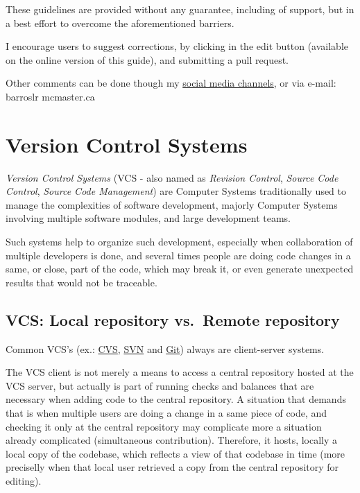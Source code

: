 \documentclass[
]{book}
\begin{document}
These guidelines are provided without any guarantee, including of support, but
in a best effort to overcome the aforementioned barriers.

I encourage users to suggest corrections, by clicking in the edit button
(available on the online version of this guide), and submitting a pull request.

Other comments can be done though my \href{http://about.me/ricardobarroslourenco/}{social media channels}, or via
e-mail: barroslr mcmaster.ca

\hypertarget{version-control-systems}{%
\chapter{Version Control Systems}\label{version-control-systems}}

\emph{Version Control Systems} \citet{wiki_version_control} (VCS - also named as \emph{Revision Control},
\emph{Source Code Control}, \emph{Source Code Management}) are Computer Systems
traditionally used to manage the complexities of software development, majorly
Computer Systems involving multiple software modules, and large development teams.

Such systems help to organize such development, especially when collaboration of
multiple developers is done, and several times people are doing code changes in
a same, or close, part of the code, which may break it, or even generate
unexpected results that would not be traceable.

\hypertarget{vcs-local-repository-vs.-remote-repository}{%
\section{VCS: Local repository vs.~Remote repository}\label{vcs-local-repository-vs.-remote-repository}}

Common VCS's (ex.: \href{https://en.wikipedia.org/wiki/Concurrent_Versions_System}{CVS},
\href{https://en.wikipedia.org/wiki/Concurrent_Versions_System}{SVN} and
\href{https://en.wikipedia.org/wiki/Git}{Git}) always are client-server systems.

The VCS client is not merely a means to access a central repository hosted
at the VCS server, but actually is part of running checks and balances that are
necessary when adding code to the central repository. A situation that demands that
is when multiple users are doing a change in a same piece of code, and checking
it only at the central repository may complicate more a situation already
complicated (simultaneous contribution). Therefore, it hosts, locally
a local copy of the codebase, which reflects a view of that codebase in time
(more preciselly when that local user retrieved a copy from the central repository
for editing).
\end{document}
